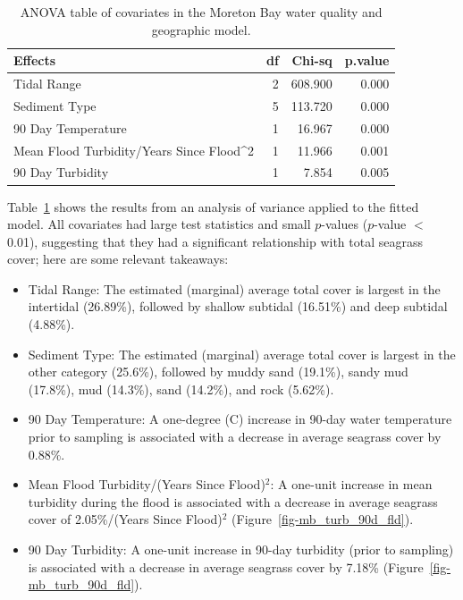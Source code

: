 \documentclass[
  letterpaper,
  DIV=11,
  numbers=noendperiod]{scrartcl}
\providecommand{\tightlist}{%
  \setlength{\itemsep}{0pt}\setlength{\parskip}{0pt}}
\begin{document}
\begin{longtable}[]{@{}lrrr@{}}

\caption{\label{tbl-mb-covariates}ANOVA table of covariates in the
Moreton Bay water quality and geographic model.}

\tabularnewline

\toprule\noalign{}
Effects & df & Chi-sq & p.value \\
\midrule\noalign{}
\endhead
\bottomrule\noalign{}
\endlastfoot
Tidal Range & 2 & 608.900 & 0.000 \\
Sediment Type & 5 & 113.720 & 0.000 \\
90 Day Temperature & 1 & 16.967 & 0.000 \\
Mean Flood Turbidity/Years Since Flood\^{}2 & 1 & 11.966 & 0.001 \\
90 Day Turbidity & 1 & 7.854 & 0.005 \\

\end{longtable}

Table~\ref{tbl-mb-covariates} shows the results from an analysis of
variance applied to the fitted model. All covariates had large test
statistics and small \(p\)-values (\(p\)-value \(<\) 0.01), suggesting
that they had a significant relationship with total seagrass cover; here
are some relevant takeaways:

\begin{itemize}
\tightlist
\item
  Tidal Range: The estimated (marginal) average total cover is largest
  in the intertidal (26.89\%), followed by shallow subtidal (16.51\%)
  and deep subtidal (4.88\%).
\item
  Sediment Type: The estimated (marginal) average total cover is largest
  in the other category (25.6\%), followed by muddy sand (19.1\%), sandy
  mud (17.8\%), mud (14.3\%), sand (14.2\%), and rock (5.62\%).
\item
  90 Day Temperature: A one-degree (C) increase in 90-day water
  temperature prior to sampling is associated with a decrease in average
  seagrass cover by 0.88\%.
\item
  Mean Flood Turbidity/(Years Since Flood)\(^2\): A one-unit increase in
  mean turbidity during the flood is associated with a decrease in
  average seagrass cover of 2.05\%/(Years Since Flood)\(^2\)
  (Figure~\ref{fig-mb_turb_90d_fld}).
\item
  90 Day Turbidity: A one-unit increase in 90-day turbidity (prior to
  sampling) is associated with a decrease in average seagrass cover by
  7.18\% (Figure~\ref{fig-mb_turb_90d_fld}).
\end{itemize}
\end{document}
